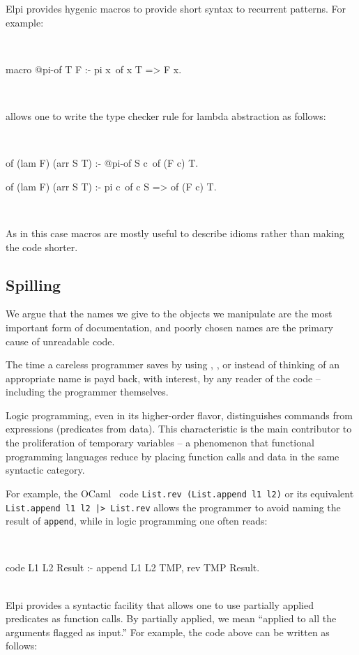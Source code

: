 \documentclass[a4paper, 11pt]{book}
\newenvironment{elpicode}
  {\VerbatimEnvironment~\\\begin{elpibox}\begin{xelpicode}}{\end{xelpicode}
\end{elpibox}\\}
\begin{document}
Elpi provides hygenic macros to provide short syntax to recurrent patterns.
For example:

\begin{elpicode}
macro @pi-of T F      :- pi x\ of x T => F x.
\end{elpicode}

\noindent allows one to write the type checker rule for lambda abstraction
as follows:

\begin{elpicode}
of (lam F) (arr S T) :- @pi-of S c\ of (F c) T.

of (lam F) (arr S T) :- pi c\ of c S => of (F c) T.
\end{elpicode}

\noindent
As in this case macros are mostly useful to describe idioms rather than
making the code shorter.


\subsection{Spilling}\label{sec:spilling}


We argue that the names we give to the objects we manipulate are the most
important form of documentation, and poorly chosen names are the primary cause
of unreadable code.

The time a careless programmer saves by using , , or
 instead of thinking of an appropriate name is payd back, with
interest, by any reader of the code -- including the programmer themselves.

Logic programming, even in its higher-order flavor, distinguishes commands
from expressions (predicates from data). This characteristic is the main
contributor to the proliferation of temporary variables -- a phenomenon that
functional programming languages reduce by placing function calls and data in
the same syntactic category.

For example, the OCaml~\cite{leroy3ocaml} code \texttt{List.rev (List.append l1 l2)} or its
equivalent \texttt{List.append l1 l2 |> List.rev} allows the programmer to
avoid naming the result of \texttt{append}, while in logic programming one
often reads:

\begin{elpicode}
code L1 L2 Result :- append L1 L2 TMP, rev TMP Result.
\end{elpicode}
Elpi provides a syntactic facility that allows one to use partially applied
predicates as function calls. By partially applied, we mean ``applied to all
the arguments flagged as input.'' For example, the code above can be written as
follows:
\end{document}
